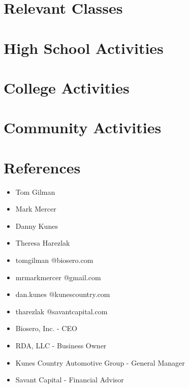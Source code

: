 \documentclass[12pt,a4paper,roman]{moderncv}        %
\begin{document}
	\section{Relevant Classes}
	
	\section{High School Activities}
	
	\section{College Activities}
	
	\section{Community Activities}
	
	\vspace{2mm}
	
	\section{References}
	\begin{cvcolumns}
		{\begin{itemize}
				\item Tom Gilman \\
				\item Mark Mercer \\
				\item Danny Kunes \\
				\item Theresa Harezlak
		\end{itemize}}
		{\begin{itemize}
				\item tomgilman @biosero.com
				\item mrmarkmercer @gmail.com
				\item dan.kunes @kunescountry.com
				\item tharezlak @savantcapital.com
		\end{itemize}}
		{\begin{itemize}
				\item Biosero, Inc.  - CEO \\
				\item RDA, LLC - Business Owner \\
				\item Kunes Country Automotive Group - General Manager
				\item Savant Capital - Financial Advisor 
		\end{itemize}}
	\end{cvcolumns}
	
\end{document}
